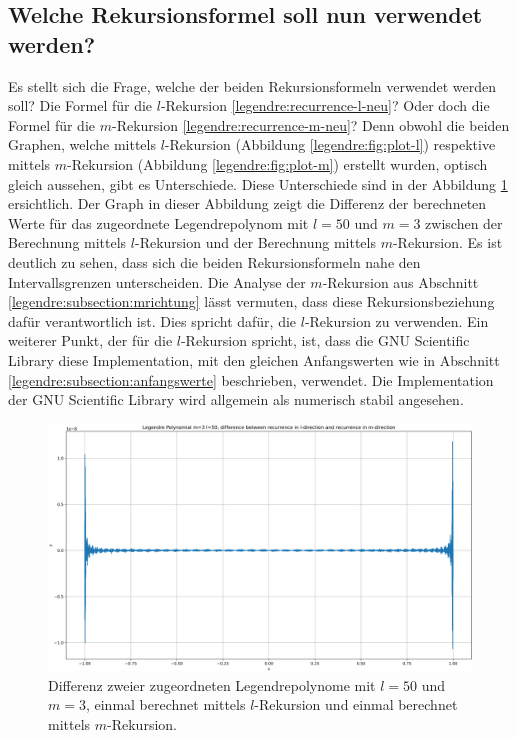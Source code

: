 \subsection{Welche Rekursionsformel soll nun verwendet werden?
\label{legendre:subsection:welche}}
Es stellt sich die Frage, welche der beiden Rekursionsformeln verwendet werden soll?
Die Formel für die $l$-Rekursion \eqref{legendre:recurrence-l-neu}?
Oder doch die Formel für die $m$-Rekursion \eqref{legendre:recurrence-m-neu}?
Denn obwohl die beiden Graphen, welche mittels $l$-Rekursion (Abbildung \ref{legendre:fig:plot-l}) respektive mittels $m$-Rekursion (Abbildung \ref{legendre:fig:plot-m}) erstellt wurden, optisch gleich aussehen, gibt es Unterschiede.
Diese Unterschiede sind in der Abbildung \ref{legendre:fig:plot-diff} ersichtlich.
Der Graph in dieser Abbildung zeigt die Differenz der berechneten Werte für das zugeordnete Legendrepolynom mit $l=50$ und $m=3$ zwischen der Berechnung mittels $l$-Rekursion und der Berechnung mittels $m$-Rekursion.
Es ist deutlich zu sehen, dass sich die beiden Rekursionsformeln nahe den Intervallsgrenzen unterscheiden.
Die Analyse der $m$-Rekursion aus Abschnitt \ref{legendre:subsection:mrichtung} lässt vermuten, dass diese Rekursionsbeziehung dafür verantwortlich ist.
Dies spricht dafür, die $l$-Rekursion zu verwenden.
Ein weiterer Punkt, der für die $l$-Rekursion spricht, ist, dass die GNU Scientific Library \cite{legendre:gsl} diese Implementation, mit den gleichen Anfangswerten wie in Abschnitt \ref{legendre:subsection:anfangswerte} beschrieben, verwendet.
%
Die Implementation der GNU Scientific Library wird allgemein als numerisch stabil angesehen.
\begin{figure}[!ht]
\centering
\includegraphics[width=1.0\linewidth]{papers/legendre/plots/plot_diff_l_m_small.png}
\caption{Differenz zweier zugeordneten Legendrepolynome mit \texorpdfstring{$l=50$}{l=50} und \texorpdfstring{$m=3$}{m=3}, einmal berechnet mittels \texorpdfstring{$l$}{l}-Rekursion und einmal berechnet mittels \texorpdfstring{$m$}{m}-Rekursion.}
\label{legendre:fig:plot-diff}
\end{figure}
